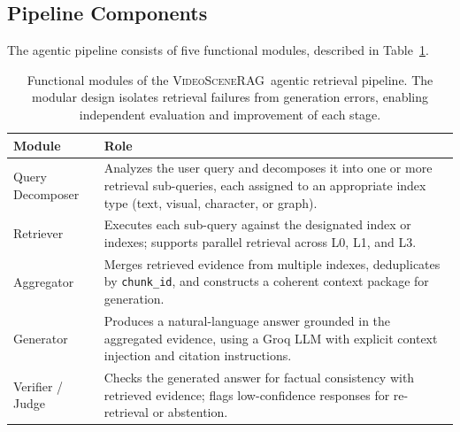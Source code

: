 \documentclass[11pt]{article}
\newcommand{\system}{\textsc{VideoSceneRAG}}
\begin{document}
\subsection{Pipeline Components}

The agentic pipeline consists of five functional modules, described in
Table~\ref{tab:agents}.

\begin{table}[!htb]
\centering
\begin{tabular}{%
  >{\raggedright\arraybackslash}p{3.2cm}
  >{\raggedright\arraybackslash}p{9.0cm}}
\toprule
\textbf{Module} & \textbf{Role} \\
\midrule
Query Decomposer  &
  Analyzes the user query and decomposes it into one or more retrieval
  sub-queries, each assigned to an appropriate index type (text, visual,
  character, or graph). \\[4pt]
Retriever         &
  Executes each sub-query against the designated index or indexes; supports
  parallel retrieval across L0, L1, and L3. \\[4pt]
Aggregator        &
  Merges retrieved evidence from multiple indexes, deduplicates by
  \texttt{chunk\_id}, and constructs a coherent context package for
  generation. \\[4pt]
Generator         &
  Produces a natural-language answer grounded in the aggregated evidence,
  using a Groq LLM with explicit context injection and citation
  instructions. \\[4pt]
Verifier / Judge  &
  Checks the generated answer for factual consistency with retrieved
  evidence; flags low-confidence responses for re-retrieval or
  abstention. \\
\bottomrule
\end{tabular}
\caption{Functional modules of the \system\ agentic retrieval pipeline.  The
modular design isolates retrieval failures from generation errors, enabling
independent evaluation and improvement of each stage.}
\label{tab:agents}
\end{table}
\end{document}
